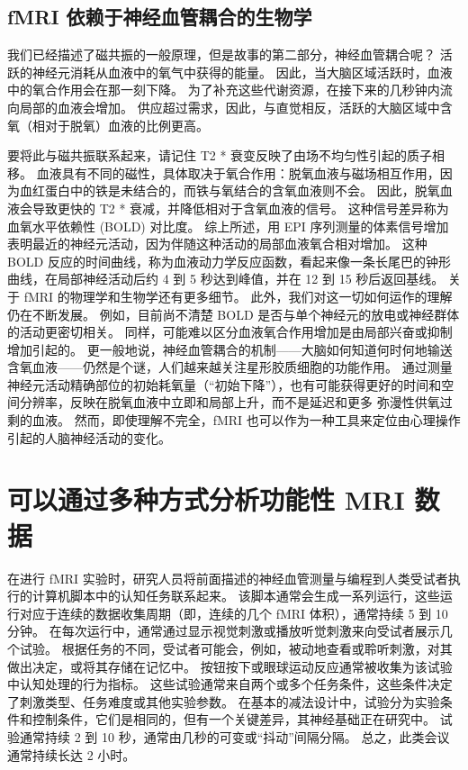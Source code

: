\subsection{fMRI 依赖于神经血管耦合的生物学}
我们已经描述了磁共振的一般原理，但是故事的第二部分，神经血管耦合呢？ 
活跃的神经元消耗从血液中的氧气中获得的能量。 
因此，当大脑区域活跃时，血液中的氧合作用会在那一刻下降。
为了补充这些代谢资源，在接下来的几秒钟内流向局部的血液会增加。 
供应超过需求，因此，与直觉相反，活跃的大脑区域中含氧（相对于脱氧）血液的比例更高。


要将此与磁共振联系起来，请记住 T2 * 衰变反映了由场不均匀性引起的质子相移。 
血液具有不同的磁性，具体取决于氧合作用：脱氧血液与磁场相互作用，因为血红蛋白中的铁是未结合的，而铁与氧结合的含氧血液则不会。 
因此，脱氧血液会导致更快的 T2 * 衰减，并降低相对于含氧血液的信号。 
这种信号差异称为血氧水平依赖性 (BOLD) 对比度。 
综上所述，用 EPI 序列测量的体素信号增加表明最近的神经元活动，因为伴随这种活动的局部血液氧合相对增加。 
这种 BOLD 反应的时间曲线，称为血液动力学反应函数，看起来像一条长尾巴的钟形曲线，在局部神经活动后约 4 到 5 秒达到峰值，并在 12 到 15 秒后返回基线。
关于 fMRI 的物理学和生物学还有更多细节。 
此外，我们对这一切如何运作的理解仍在不断发展。 
例如，目前尚不清楚 BOLD 是否与单个神经元的放电或神经群体的活动更密切相关。 
同样，可能难以区分血液氧合作用增加是由局部兴奋或抑制增加引起的。 
更一般地说，神经血管耦合的机制——大脑如何知道何时何地输送含氧血液——仍然是个谜，人们越来越关注星形胶质细胞的功能作用。 
通过测量神经元活动精确部位的初始耗氧量（“初始下降”），也有可能获得更好的时间和空间分辨率，反映在脱氧血液中立即和局部上升，而不是延迟和更多 弥漫性供氧过剩的血液。 
然而，即使理解不完全，fMRI 也可以作为一种工具来定位由心理操作引起的人脑神经活动的变化。


\section{可以通过多种方式分析功能性 MRI 数据}
在进行 fMRI 实验时，研究人员将前面描述的神经血管测量与编程到人类受试者执行的计算机脚本中的认知任务联系起来。 
该脚本通常会生成一系列运行，这些运行对应于连续的数据收集周期（即，连续的几个 fMRI 体积），通常持续 5 到 10 分钟。 
在每次运行中，通常通过显示视觉刺激或播放听觉刺激来向受试者展示几个试验。 
根据任务的不同，受试者可能会，例如，被动地查看或聆听刺激，对其做出决定，或将其存储在记忆中。 
按钮按下或眼球运动反应通常被收集为该试验中认知处理的行为指标。 
这些试验通常来自两个或多个任务条件，这些条件决定了刺激类型、任务难度或其他实验参数。 
在基本的减法设计中，试验分为实验条件和控制条件，它们是相同的，但有一个关键差异，其神经基础正在研究中。 
试验通常持续 2 到 10 秒，通常由几秒的可变或“抖动”间隔分隔。 
总之，此类会议通常持续长达 2 小时。



